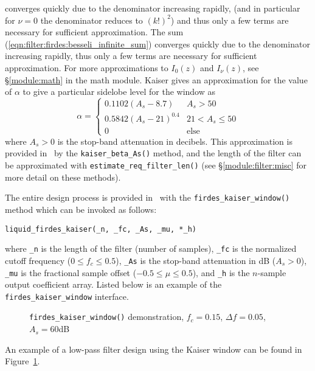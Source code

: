 converges quickly due to the denominator increasing rapidly, 
(and in particular for $\nu=0$ the denominator reduces to $(k!)^2$)
and thus only a few terms are necessary for sufficient approximation.
%
The sum (\ref{eqn:filter:firdes:besseli_infinite_sum}) converges quickly
due to the denominator increasing rapidly, thus only a few terms are
necessary for sufficient approximation.
For more approximations to $I_0(z)$ and $I_\nu(z)$,
see \S\ref{module:math} in the math module.
%
Kaiser gives an approximation for the value of $\alpha$ to give a
particular sidelobe level for the window as
\cite[(3.2.7)]{Vaidyanathan:1993}
\begin{equation}
\label{eq:kaiser_alpha}
    \alpha =
    \begin{cases}
        0.1102 (A_s - 8.7)      &   A_s > 50 \\
        0.5842 (A_s - 21)^{0.4} &   21 < A_s \le 50 \\
        0                       &   \text{else}
    \end{cases}
\end{equation}
%
where $A_s > 0$ is the stop-band attenuation in decibels.
%
This approximation is provided in \liquid\ by the
{\tt kaiser\_beta\_As()} method,
and the length of the filter can be approximated with
{\tt estimate\_req\_filter\_len()}
(see \S\ref{module:filter:misc} for more detail on these methods).

The entire design process is provided in \liquid\ with the
{\tt firdes\_kaiser\_window()} method which can be invoked as follows:
%
\begin{Verbatim}[fontsize=\small]
    liquid_firdes_kaiser(_n, _fc, _As, _mu, *_h)
\end{Verbatim}
%
where
{\tt \_n} is the length of the filter (number of samples),
{\tt \_fc} is the normalized cutoff frequency ($0 \leq f_c \leq 0.5$),
{\tt \_As} is the stop-band attenuation in dB ($A_s > 0$),
{\tt \_mu} is the fractional sample offset ($-0.5 \leq \mu \leq 0.5$),
and {\tt *\_h} is the $n$-sample output coefficient array.
%
Listed below is an example of the {\tt firdes\_kaiser\_window}
interface.
%

%
\begin{figure}
\centering
{}
\caption{{\tt firdes\_kaiser\_window()} demonstration, $f_c=0.15$,
         $\Delta f=0.05$, $A_s=60$dB}
\label{fig:module:filter:firdes_kaiser}
\end{figure}
%
An example of a low-pass filter design using the Kaiser window can be
found in Figure~\ref{fig:module:filter:firdes_kaiser}.


